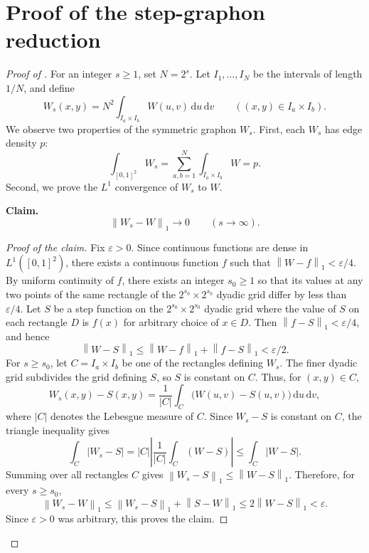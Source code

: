 \documentclass[11pt]{article}
\theoremstyle{remark}
\numberwithin{equation}{section}
\newcommand{\norm}[1]{\left\lVert #1\right\rVert}
\newcommand{\dd}{\,\mathrm d}
\begin{document}



\appendix
{}

\section{Proof of the step-graphon reduction}
\label{app:step-reduction}

\begin{proof}[Proof of ]
  For an integer $s\ge1$, set $N=2^s$. Let $I_1,\ldots,I_N$ be the
  intervals of length $1/N$, and
  define
  \[
    W_s(x,y)=N^2\int_{I_a\times I_b}W(u,v)\dd u\dd v
    \qquad ((x,y)\in I_a\times I_b).
  \]
  We observe two properties of the symmetric graphon $W_s$.
  First, each $W_s$ has edge density $p$:
  \[
    \int_{[0,1]^2} W_s = \sum_{a,b=1}^N \int_{I_a \times I_b} W = p.
  \]
  Second, we prove the $L^1$ convergence of $W_s$ to $W$.

  \smallskip
  \noindent\textbf{Claim.} 
  \begin{equation}\label{eq:step-L1}
    \norm{W_s-W}_1\longrightarrow0
    \qquad(s\to\infty).
  \end{equation}

  \begin{proof}[Proof of the claim]
    \renewcommand{\qedsymbol}{\ensuremath{\blacksquare}}
    Fix $\varepsilon>0$. Since continuous functions are dense in
    $L^1([0,1]^2)$, there exists a continuous function $f$ such that
    $\norm{W-f}_1<\varepsilon/4$.
    By uniform continuity of $f$, there exists an integer $s_0\ge1$ so that
    its values at any two points of the same rectangle of the
    $2^{s_0}\times2^{s_0}$ dyadic grid differ by less than $\varepsilon/4$.
    Let $S$ be a step function on the $2^{s_0}\times2^{s_0}$ dyadic grid where the value of $S$ on each rectangle $D$ is $f(x)$ for arbitrary choice of $x \in D$.
    Then $\norm{f-S}_1<\varepsilon/4$, and hence
    \[
      \norm{W-S}_1
      \le\norm{W-f}_1+\norm{f-S}_1<\varepsilon/2.
    \]
    For $s\ge s_0$, let $C=I_a\times I_b$ be one of the rectangles
    defining $W_s$. The finer dyadic grid subdivides the grid defining
    $S$, so $S$ is constant on $C$. Thus, for $(x,y)\in C$,
    \[
      W_s(x,y)-S(x,y)
      =\frac1{|C|}\int_C\bigl(W(u,v)-S(u,v)\bigr)\dd u\dd v,
    \]
    where $|C|$ denotes the Lebesgue measure of $C$.
    Since $W_s-S$ is constant on $C$, the triangle inequality gives
    \[
      \int_C|W_s-S|
      =|C|\left|\frac1{|C|}\int_C(W-S)\right|
      \le\int_C|W-S|.
    \]
    Summing over all rectangles $C$ gives
    $\norm{W_s-S}_1\le\norm{W-S}_1$.
    Therefore, for every $s\ge s_0$,
    \[
      \norm{W_s-W}_1
      \le\norm{W_s-S}_1+\norm{S-W}_1
      \le2\norm{W-S}_1<\varepsilon.
    \]
    Since $\varepsilon>0$ was arbitrary, this proves the claim.
  \end{proof}


\end{proof}
\end{document}

